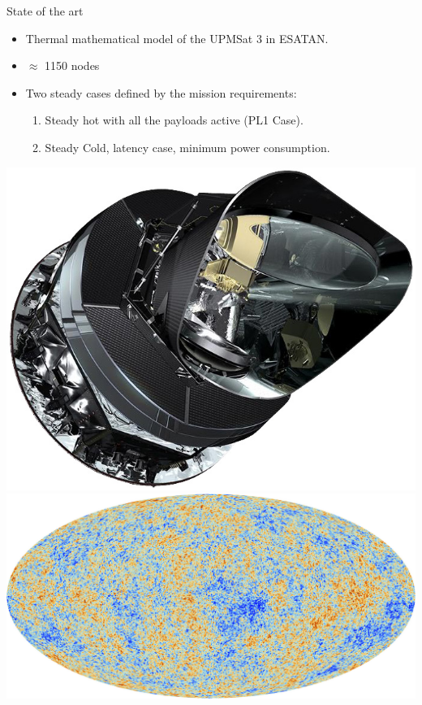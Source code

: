 \begin{frame}{State of the art}
    \begin{minipage}{0.65\textwidth}
    \begin{itemize}
        \item Thermal mathematical model of the UPMSat 3 in ESATAN. 
        \item $\approx$ 1150 nodes
        \item Two steady cases defined by the mission requirements:
        \begin{enumerate}
            \item Steady hot with all the payloads active (PL1 Case).
            \item Steady Cold, latency case, minimum power consumption.
        \end{enumerate}
    \end{itemize}
    \end{minipage}
    \begin{minipage}{0.3\textwidth}
    \includegraphics[width=0.9\linewidth]{Figures/Planck1.jpg} \\
    \includegraphics[width=0.9\linewidth]{Figures/Planck2.jpg}
    \end{minipage}
    
\end{frame}

